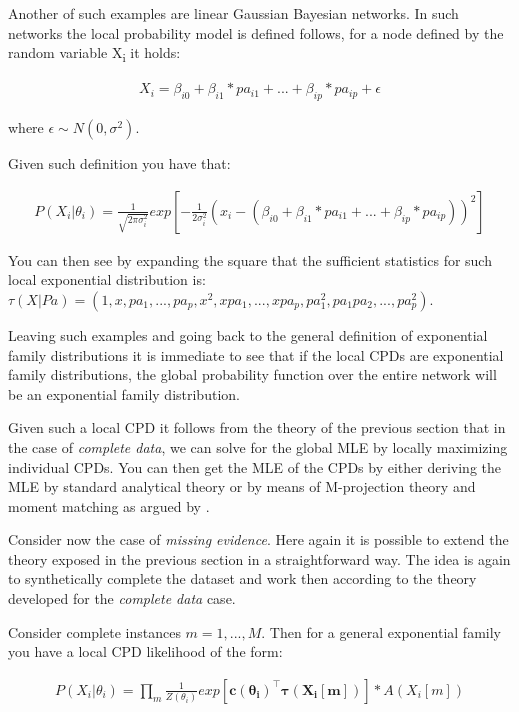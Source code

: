\documentclass[11pt]{article}
\begin{document}
\begin{article}
Another of such examples are linear Gaussian Bayesian networks. In
such networks the local probability model is defined follows, for
a node defined by the random variable X\textsubscript{i} it holds:

\begin{align} \label{eq:local-prob-model}
X_i = \beta_{i0} + \beta_{i1} * pa_{i1} + ... + \beta_{ip} * pa_{ip} + \epsilon
\end{align}

where \(\epsilon \sim N(0,\sigma^2)\).

Given such definition you have that:

\begin{align} \label{eq:gaussian-cpd}
P(X_i|\theta_i) = \frac{1}{\sqrt{2\pi\sigma_i^2}} exp[-\frac{1}{2\sigma_i^2} (x_i - (\beta_{i0} + \beta_{i1} * pa_{i1} + ... + \beta_{ip} * pa_{ip}))^2] 
\end{align}

You can then see by expanding the square that the sufficient
statistics for such local exponential distribution is: \(\tau(X|Pa) =
    (1,x,pa_1, ..., pa_p, x^2, xpa_1, . . . , xpa_p, pa_1^2, pa_1pa_2,
    . . . , pa_p^2)\).

Leaving such examples and going back to the general definition of
exponential family distributions it is immediate to see that if
the local CPDs are exponential family distributions, the global
probability function over the entire network will be an
exponential family distribution.

Given such a local CPD it follows from the theory of the previous
section that in the case of \emph{complete data}, we can solve for the
global MLE by locally maximizing individual CPDs. You can then get
the MLE of the CPDs by either deriving the MLE by standard
analytical theory or by means of M-projection theory and moment
matching as argued by \cite{koller2009probabilistic}.

Consider now the case of \emph{missing evidence}. Here again it is
possible to extend the theory exposed in the previous section in a
straightforward way. The idea is again to synthetically complete
the dataset and work then according to the theory developed for
the \emph{complete data} case.

Consider complete instances \(m = 1, ..., M\). Then for a general
exponential family you have a local CPD likelihood of the form:

\begin{align} \label{eq:exponential-family-likelihood}
P(X_i|\theta_i) = \prod_m \frac{1}{Z(\theta_i)} exp[\mathbf{c(\theta_i)}^\intercal \mathbf{\tau(X_i[m])}] * A(X_i[m]) 
\end{align}


\end{article}
\end{document}
